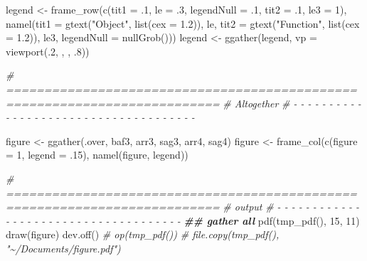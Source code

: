 \documentclass[
]{article}
\newenvironment{Shaded}{\begin{snugshade}}{\end{snugshade}}
\newcommand{\AttributeTok}[1]{\textcolor[rgb]{0.77,0.63,0.00}{#1}}
\newcommand{\CommentTok}[1]{\textcolor[rgb]{0.56,0.35,0.01}{\textit{#1}}}
\newcommand{\DecValTok}[1]{\textcolor[rgb]{0.00,0.00,0.81}{#1}}
\newcommand{\DocumentationTok}[1]{\textcolor[rgb]{0.56,0.35,0.01}{\textbf{\textit{#1}}}}
\newcommand{\FloatTok}[1]{\textcolor[rgb]{0.00,0.00,0.81}{#1}}
\newcommand{\FunctionTok}[1]{\textcolor[rgb]{0.00,0.00,0.00}{#1}}
\newcommand{\NormalTok}[1]{#1}
\newcommand{\OtherTok}[1]{\textcolor[rgb]{0.56,0.35,0.01}{#1}}
\newcommand{\StringTok}[1]{\textcolor[rgb]{0.31,0.60,0.02}{#1}}
\begin{document}
\begin{Shaded}
\begin{Highlighting}[]
\NormalTok{legend }\OtherTok{\textless{}{-}} \FunctionTok{frame\_row}\NormalTok{(}\FunctionTok{c}\NormalTok{(}\AttributeTok{tit1 =}\NormalTok{ .}\DecValTok{1}\NormalTok{, }\AttributeTok{le =}\NormalTok{ .}\DecValTok{3}\NormalTok{, }\AttributeTok{legendNull =}\NormalTok{ .}\DecValTok{1}\NormalTok{,}
                      \AttributeTok{tit2 =}\NormalTok{ .}\DecValTok{1}\NormalTok{, }\AttributeTok{le3 =} \DecValTok{1}\NormalTok{),}
                    \FunctionTok{namel}\NormalTok{(}\AttributeTok{tit1 =} \FunctionTok{gtext}\NormalTok{(}\StringTok{"Object"}\NormalTok{, }\FunctionTok{list}\NormalTok{(}\AttributeTok{cex =} \FloatTok{1.2}\NormalTok{)), le,}
                          \AttributeTok{tit2 =} \FunctionTok{gtext}\NormalTok{(}\StringTok{"Function"}\NormalTok{, }\FunctionTok{list}\NormalTok{(}\AttributeTok{cex =} \FloatTok{1.2}\NormalTok{)), le3,}
                          \AttributeTok{legendNull =} \FunctionTok{nullGrob}\NormalTok{()))}
\NormalTok{legend }\OtherTok{\textless{}{-}} \FunctionTok{ggather}\NormalTok{(legend, }\AttributeTok{vp =} \FunctionTok{viewport}\NormalTok{(.}\DecValTok{2}\NormalTok{, , , .}\DecValTok{8}\NormalTok{))}
\end{Highlighting}
\end{Shaded}

\begin{Shaded}
\begin{Highlighting}[]
\CommentTok{\# ==========================================================================}
\CommentTok{\# Altogether}
\CommentTok{\# {-} {-} {-} {-} {-} {-} {-} {-} {-} {-} {-} {-} {-} {-} {-} {-} {-} {-} {-} {-} {-} {-} {-} {-} {-} {-} {-} {-} {-} {-} {-} {-} {-} {-} {-} {-} {-}}

\NormalTok{figure }\OtherTok{\textless{}{-}} \FunctionTok{ggather}\NormalTok{(.over, baf3, arr3, sag3, arr4, sag4)}
\NormalTok{figure }\OtherTok{\textless{}{-}} \FunctionTok{frame\_col}\NormalTok{(}\FunctionTok{c}\NormalTok{(}\AttributeTok{figure =} \DecValTok{1}\NormalTok{, }\AttributeTok{legend =}\NormalTok{ .}\DecValTok{15}\NormalTok{),}
                    \FunctionTok{namel}\NormalTok{(figure, legend))}
\end{Highlighting}
\end{Shaded}

\begin{Shaded}
\begin{Highlighting}[]
\CommentTok{\# ==========================================================================}
\CommentTok{\# output}
\CommentTok{\# {-} {-} {-} {-} {-} {-} {-} {-} {-} {-} {-} {-} {-} {-} {-} {-} {-} {-} {-} {-} {-} {-} {-} {-} {-} {-} {-} {-} {-} {-} {-} {-} {-} {-} {-} {-} {-}}
\DocumentationTok{\#\# gather all}
\FunctionTok{pdf}\NormalTok{(}\FunctionTok{tmp\_pdf}\NormalTok{(), }\DecValTok{15}\NormalTok{, }\DecValTok{11}\NormalTok{)}
\FunctionTok{draw}\NormalTok{(figure)}
\FunctionTok{dev.off}\NormalTok{()}
\CommentTok{\# op(tmp\_pdf())}
\CommentTok{\# file.copy(tmp\_pdf(), "\textasciitilde{}/Documents/figure.pdf")}
\end{Highlighting}
\end{Shaded}
\end{document}
